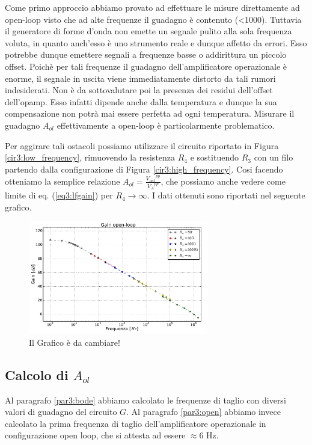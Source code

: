 Come primo approccio abbiamo provato ad effettuare le misure direttamente ad open-loop visto che ad alte frequenze il guadagno è contenuto (\num{<1000}).
Tuttavia il generatore di forme d'onda non emette un segnale pulito alla sola frequenza voluta, in quanto anch'esso è uno strumento reale e dunque affetto da errori.
Esso potrebbe dunque emettere segnali a frequenze basse o addirittura un piccolo offset.
Poichè per tali frequenze il guadagno dell'amplificatore operazionale è enorme, il segnale in uscita viene immediatamente distorto da tali rumori indesiderati.
Non è da sottovalutare poi la presenza dei residui dell'offset dell'opamp.
Esso infatti dipende anche dalla temperatura e dunque la sua compensazione non potrà mai essere perfetta ad ogni temperatura.
Misurare il guadagno $A_{ol}$ effettivamente a open-loop è particolarmente problematico.

Per aggirare tali ostacoli possiamo utilizzare il circuito riportato in Figura \ref{cir3:low_frequency}, rimuovendo la resistenza $R_4$ e sostituendo $R_3$ con un filo partendo dalla configurazione di Figura \ref{cir3:high_frequency}.
Cosi facendo otteniamo la semplice relazione $A_{ol}=\frac{{V_{out}}^{pp}}{{V_A}^{pp}}$, che possiamo anche vedere come limite di eq. (\ref{eq3:lfgain}) per $R_4 \rightarrow \infty$.
I dati ottenuti sono riportati nel seguente grafico. 

\begin{figure}
	\centering
	\includegraphics[width=0.7\textwidth]{../E03/latex/gol.pdf}
	\caption{Il Grafico è da cambiare!}
  \label{cir3:gain_open_loop}
\end{figure}

\subsection{Calcolo di $A_{ol}$}

Al paragrafo \ref{par3:bode} abbiamo calcolato le frequenze di taglio con diversi valori di guadagno del circuito $G$. Al paragrafo \ref{par3:open} abbiamo invece calcolato la prima frequenza di taglio dell'amplificatore operazionale in configurazione open loop, che si attesta ad essere $\approx 6$ \si{\hertz}.

